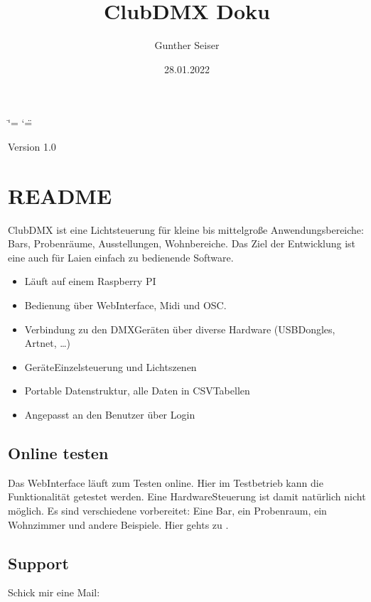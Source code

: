 \documentclass[letterpaper,10pt,ngerman]{sphinxmanual}
\title{ClubDMX Doku}
\date{28.01.2022}
\author{Gunther Seiser}
\begin{document}
\ifdefined\shorthandoff
  \ifnum\catcode`\=\string=\active\shorthandoff{=}\fi
  \ifnum\catcode`\"=\active{}\fi
\fi

\pagestyle{empty}
\sphinxmaketitle
\pagestyle{plain}
\sphinxtableofcontents
\pagestyle{normal}
\label{\detokenize{inhalt::doc}}


Version 1.0


\chapter{README}
\label{\detokenize{readme:readme}}\label{\detokenize{readme::doc}}
ClubDMX ist eine Lichtsteuerung für kleine bis mittelgroße Anwendungsbereiche:
Bars, Probenräume, Ausstellungen, Wohnbereiche. Das Ziel der Entwicklung ist
eine auch für Laien einfach zu bedienende Software.
\begin{itemize}
\item {} 
Läuft auf einem Raspberry PI

\item {} 
Bedienung über Web\sphinxhyphen{}Interface, Midi und OSC.

\item {} 
Verbindung zu den DMX\sphinxhyphen{}Geräten über diverse Hardware
(USB\sphinxhyphen{}Dongles, Artnet, …)

\item {} 
Geräte\sphinxhyphen{}Einzelsteuerung und Lichtszenen

\item {} 
Portable Datenstruktur, alle Daten in CSV\sphinxhyphen{}Tabellen

\item {} 
Angepasst an den Benutzer über Login

\end{itemize}


\section{Online testen}
\label{\detokenize{readme:online-testen}}
Das Web\sphinxhyphen{}Interface läuft zum Testen online. Hier im Testbetrieb kann die
Funktionalität getestet werden. Eine Hardware\sphinxhyphen{}Steuerung ist damit natürlich
nicht möglich. Es sind verschiedene  vorbereitet: Eine Bar,
ein Probenraum, ein Wohnzimmer und andere Beispiele. Hier gehts zu
 .


\section{Support}
\label{\detokenize{readme:support}}
Schick mir eine Mail: 
\end{document}
